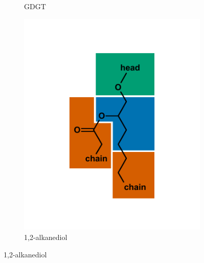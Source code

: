 {\begin{figure}[p]
\begin{subfigure}[b]{.6\linewidth}
    	\caption{GDGT}
        \label{fig:GDGT}
    \end{subfigure}
    \begin{subfigure}[b]{.3\linewidth}
    	\includegraphics[width=\linewidth]{figs_ch1/alkanediol}
    	\caption{1,2-alkanediol}
        \label{fig:diol}
    \end{subfigure}
\end{figure}
\newpage
\begin{figure}[h]\ContinuedFloat


\end{figure}}

